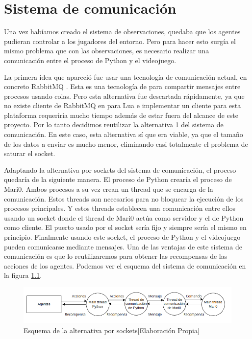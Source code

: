 \chapter{Sistema de comunicación}

Una vez habíamos creado el sistema de observaciones, quedaba que los agentes pudieran controlar a los jugadores del entorno. Pero para hacer esto surgía el mismo problema que con las observaciones, es necesario realizar una comunicación entre el proceso de Python y el videojuego.

La primera idea que apareció fue usar una tecnología de comunicación actual, en concreto RabbitMQ \cite {RabbitMQ}. Esta es una tecnología de para compartir mensajes entre procesos usando colas. Pero esta alternativa fue descartada rápidamente, ya que no existe cliente de RabbitMQ en para Lua e implementar un cliente para esta plataforma requeriría mucho tiempo además de estar fuera del alcance de este proyecto. Por lo tanto decidimos reutilizar la alternativa 1 del sistema de comunicación. En este caso, esta alternativa sí que era viable, ya que el tamaño de los datos a enviar es mucho menor, eliminando casi totalmente el problema de saturar el socket.

Adaptando la alternativa por sockets del sistema de comunicación, el proceso quedaría de la siguiente manera. El proceso de Python crearía el proceso de Mari0. Ambos procesos a su vez crean un thread que se encarga de la comunicación. Estos threads son necesarios para no bloquear la ejecución de los procesos principales. Y estos threads establecen una comunicación entre ellos usando un socket donde el thread de Mari0 actúa como servidor y el de Python como cliente. El puerto usado por el socket sería fijo y siempre sería el mismo en principio. Finalmente usando este socket, el proceso de Python y el videojuego pueden comunicarse mediante mensajes. Una de las ventajas de este sistema de comunicación es que lo reutilizaremos para obtener las recompensas de las acciones de los agentes. Podemos ver el esquema del sistema de comunicación en la figura \ref {fig:alternativa-1-acc}. 

\begin{figure}[ht]
    \centering
    \includegraphics[width=1.0\textwidth]{img/comunication.png}
    \caption{Esquema de la alternativa por sockets[Elaboración Propia]}
    \label{fig:alternativa-1-acc}
\end{figure}


